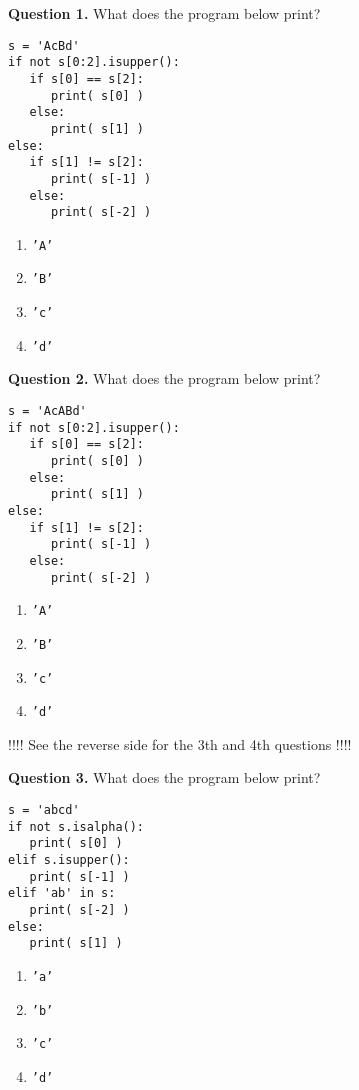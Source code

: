 \documentclass[12pt]{article}
\begin{document}


{\bf Question 1.}   What does the program below print?
\begin{lstlisting}[frame=single]
s = 'AcBd'
if not s[0:2].isupper():
   if s[0] == s[2]:
      print( s[0] )
   else:
      print( s[1] )
else:
   if s[1] != s[2]:
      print( s[-1] )
   else:
      print( s[-2] )
\end{lstlisting}
\vspace{-0.5cm}
  \begin{enumerate}[label=\Alph*]
  	\item  \texttt{'A'}
  	\item  \texttt{'B'} 
  	\item  \texttt{'c'} %
  	\item  \texttt{'d'}
  \end{enumerate}

{\bf Question 2.}   What does the program below print?
\begin{lstlisting}[frame=single]
s = 'AcABd'
if not s[0:2].isupper():
   if s[0] == s[2]:
      print( s[0] )
   else:
      print( s[1] )
else:
   if s[1] != s[2]:
      print( s[-1] )
   else:
      print( s[-2] )
\end{lstlisting}
\vspace{-0.5cm}
\begin{enumerate}[label=\Alph*]
	\item  \texttt{'A'} %
	\item  \texttt{'B'} 
	\item  \texttt{'c'} 
	\item  \texttt{'d'}
\end{enumerate}

!!!! See the reverse side for the 3th and 4th questions !!!!

\pagebreak

{\bf Question 3.}  What does the program below print?
\begin{lstlisting}[frame=single]
s = 'abcd'
if not s.isalpha():
   print( s[0] )
elif s.isupper():
   print( s[-1] )
elif 'ab' in s:
   print( s[-2] )
else:
   print( s[1] )
\end{lstlisting}
\vspace{-0.5cm}
\begin{enumerate}[label=\Alph*]
	\item  \texttt{'a'} 
	\item  \texttt{'b'} 
	\item  \texttt{'c'} %
	\item  \texttt{'d'}
\end{enumerate}
\end{document}
